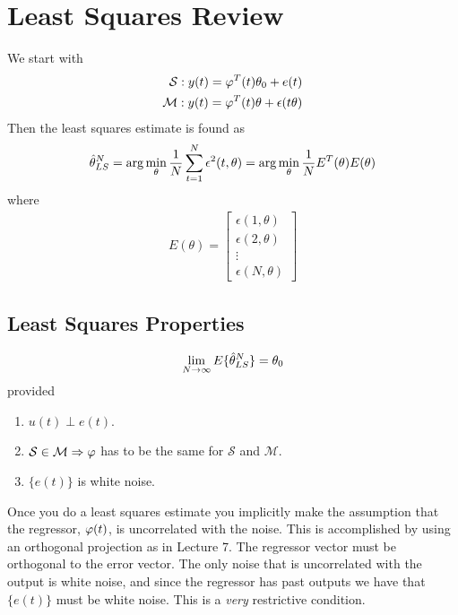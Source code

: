 % 
% 
%
%
% 
\mainmatter
\setcounter{page}{1}

\lectureseries[\course]{\course}

\date{September 24, 2009}

\setaddress

\setcounter{lecture}{9}
\setcounter{chapter}{9}


\section{Least Squares Review}
We start with
\begin{align}
\label{eq:sys}
\mathcal{S}: y(t) = \varphi^T(t)\theta_0+e(t) \\
\label{eq:model}
\mathcal{M}: y(t) = \varphi^T(t)\theta+\epsilon(t\theta)
\end{align}
Then the least squares estimate is found as
\begin{align*}
\hat{\theta}_{LS}^N = \arg\min_\theta \frac{1}{N} \sum_{t=1}^N \epsilon^2(t,\theta) = \arg\min_\theta \frac{1}{N} E^T(\theta)E(\theta)
\end{align*}
where
\begin{align*}
E(\theta) = \left[\begin{array}{c} \epsilon(1,\theta) \\ \epsilon(2,\theta) \\ \vdots \\ \epsilon(N,\theta) \end{array}\right]
\end{align*}

\subsection{Least Squares Properties}
\begin{align*}
\lim_{N\to\infty} E\{\hat{\theta}_{LS}^N\} = \theta_0
\end{align*}
provided
\begin{enumerate}
\item $u(t)\perp e(t)$.
\item $\mathcal{S}\in\mathcal{M} \Rightarrow \varphi$ has to be the same for $\mathcal{S}$ and $\mathcal{M}$.
\item $\{e(t)\}$ is white noise.
\end{enumerate}
Once you do a least squares estimate you implicitly make the assumption that the regressor, $\varphi(t)$, is uncorrelated with the noise. This is accomplished by using an orthogonal projection as in Lecture 7. The regressor vector must be orthogonal to the error vector. The only noise that is uncorrelated with the output is white noise, and since the regressor has past outputs we have that $\{e(t)\}$ must be white noise. This is a \textit{very} restrictive condition.

